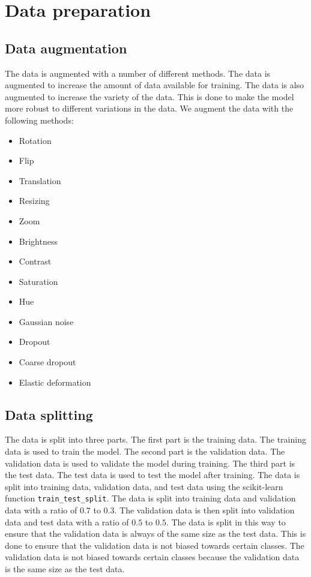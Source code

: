 \section{Data preparation}
\label{sec:data_preparation}



\subsection{Data augmentation}

The data is augmented with a number of different methods. The data is augmented to increase the amount of data available for training. The data is also augmented to increase the variety of the data. This is done to make the model more robust to different variations in the data. We augment the data with the following methods:

\begin{itemize}
  \item Rotation
  \item Flip
  \item Translation
  \item Resizing
  \item Zoom
  \item Brightness
  \item Contrast
  \item Saturation
  \item Hue
  \item Gaussian noise
  \item Dropout
  \item Coarse dropout
  \item Elastic deformation
\end{itemize}

\subsection{Data splitting}

The data is split into three parts. The first part is the training data. The training data is used to train the model. The second part is the validation data. The validation data is used to validate the model during training. The third part is the test data. The test data is used to test the model after training. The data is split into training data, validation data, and test data using the scikit-learn function \texttt{train\_test\_split}. The data is split into training data and validation data with a ratio of $0.7$ to $0.3$. The validation data is then split into validation data and test data with a ratio of $0.5$ to $0.5$. The data is split in this way to ensure that the validation data is always of the same size as the test data. This is done to ensure that the validation data is not biased towards certain classes. The validation data is not biased towards certain classes because the validation data is the same size as the test data. 
